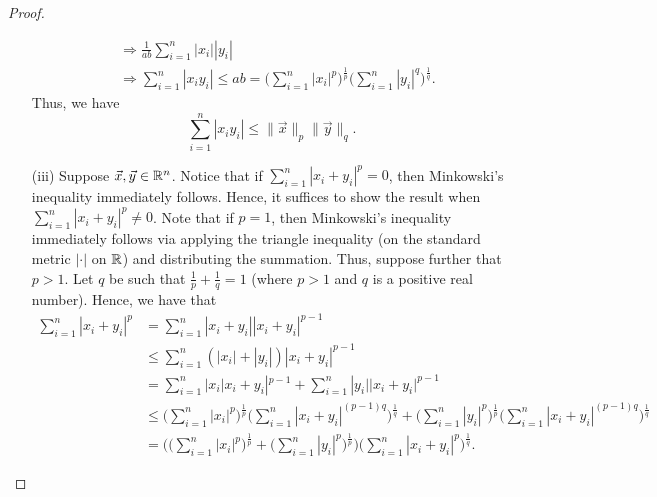 \documentclass[a4paper]{article}
\begin{document}
\begin{proof}
\begin{enumerate}
\begin{align*}
        &\Longrightarrow \frac{ 1 }{ ab } \sum_{ i=1  }^{ n } | {x}_{i} |  | {y}_{i} | \\
        &\Longrightarrow \sum_{ i=1  }^{ n } | {x}_{i} {y}_{i}  | \leq ab = \Big(  \sum_{ i=1  }^{ n } | {x}_{i} |^{p} \Big)^{\frac{ 1 }{ p } } \Big(  \sum_{ i=1  }^{ n } | {y}_{i} |^{q} \Big)^{\frac{ 1 }{ q }}.
    \end{align*}
    Thus, we have 
    \[  \sum_{ i=1  }^{ n } | {x}_{i} {y}_{i} | \leq \|\vec{ x } \|_{p} \|\vec{ y } \|_{q}. \]
    \item[(iii)] Suppose \( \vec{ x } , \vec{ y }  \in \mathbb{R}^{n} \). Notice that if \( \sum_{ i=1  }^{ n } | {x}_{i} + {y}_{i} |^{p} = 0  \), then Minkowski's inequality immediately follows. Hence, it suffices to show the result when \( \sum_{ i=1  }^{ n } | {x}_{i} + {y}_{i} |^{p} \neq 0  \). Note that if \( p = 1  \), then Minkowski's inequality immediately follows via applying the triangle inequality (on the standard metric \( | \cdot |  \) on \( \mathbb{R}  \)) and distributing the summation. Thus, suppose further that \( p > 1  \). Let \( q  \) be such that \( \frac{ 1 }{ p }  + \frac{ 1 }{ q }  = 1  \) (where \( p > 1  \) and \( q  \) is a positive real number). Hence, we have that 
        \begin{align*}
            \sum_{ i=1  }^{ n } | {x}_{i} + {y}_{i} |^{p} &= \sum_{ i=1  }^{ n } | {x}_{i} + {y}_{i} |  | {x}_{i} + {y}_{i} |^{p-1} \\
                                                          &\leq \sum_{ i=1  }^{ n } (| {x}_{i}  |  + | {y}_{i} | )| {x}_{i} + {y}_{i} |^{p-1} \\
                                                          &= \sum_{ i=1  }^{ n } | {x}_{i} | {x}_{i} + {y}_{i}  |^{p-1} + \sum_{ i=1  }^{ n } | {y}_{i} |  | {x}_{i} + {y}_{i} |^{p-1} \\
                                                          &\leq \Big(  \sum_{ i=1  }^{ n } | {x}_{i} |^{p} \Big)^{\frac{ 1 }{ p }} \Big(  \sum_{ i=1  }^{ n } | {x}_{i} + {y}_{i} |^{(p-1)q} \Big)^{\frac{ 1 }{ q } }  + \Big(  \sum_{ i=1  }^{ n } | {y}_{i} |^{p} \Big)^{\frac{ 1 }{ p } } \Big(  \sum_{ i=1  }^{ n } | {x}_{i} + {y}_{i} |^{(p-1)q} \Big)^{\frac{ 1 }{ q } } \tag{Holder's Inequality} \\
                                                          &= \Bigg( \Big( \sum_{ i=1  }^{ n } | {x}_{i} |^{p} \Big)^{\frac{ 1 }{ p }} + \Big(  \sum_{ i=1  }^{ n } | {y}_{i} |^{p} \Big)^{\frac{ 1 }{ p } }   \Bigg) \Big(  \sum_{ i=1  }^{ n } | {x}_{i} + {y}_{i} |^{p} \Big)^{\frac{ 1 }{ q } }.

\end{align*}
\end{enumerate}
\end{proof}
\end{document}
